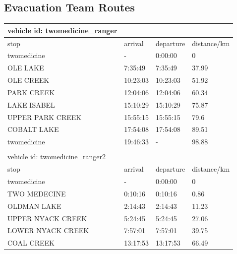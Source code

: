 \documentclass[12pt]{article}
\begin{document}
\newpage
{}
\begin{appendices}
\section{Evacuation Team Routes}
\label{sec:routesAppendix}
\begin{table}[ht!]
\begin{tabular}{@{}llll@{}}
\toprule
vehicle id: twomedicine\_ranger  &          &           &             \\ \midrule
stop                             & arrival  & departure & distance/km \\
twomedicine                      & -        & 0:00:00   & 0           \\
OLE LAKE                         & 7:35:49  & 7:35:49   & 37.99       \\
OLE CREEK                        & 10:23:03 & 10:23:03  & 51.92       \\
PARK CREEK                       & 12:04:06 & 12:04:06  & 60.34       \\
LAKE ISABEL                      & 15:10:29 & 15:10:29  & 75.87       \\
UPPER PARK CREEK                 & 15:55:15 & 15:55:15  & 79.6        \\
COBALT LAKE                      & 17:54:08 & 17:54:08  & 89.51       \\
twomedicine                      & 19:46:33 & -         & 98.88       \\ \bottomrule
                                 &          &           &             \\ \toprule
vehicle id: twomedicine\_ranger2 &          &           &             \\ \midrule
stop                             & arrival  & departure & distance/km \\
twomedicine                      & -        & 0:00:00   & 0           \\
TWO MEDECINE                     & 0:10:16  & 0:10:16   & 0.86        \\
OLDMAN LAKE                      & 2:14:43  & 2:14:43   & 11.23       \\
UPPER NYACK CREEK                & 5:24:45  & 5:24:45   & 27.06       \\
LOWER NYACK CREEK                & 7:57:01  & 7:57:01   & 39.75       \\
COAL CREEK                       & 13:17:53 & 13:17:53  & 66.49       \\

\end{tabular}
\end{table}
\end{appendices}
\end{document}
